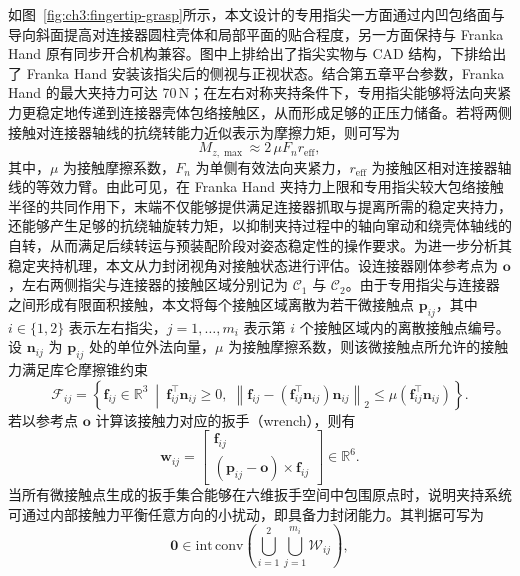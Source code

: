如图~\ref{fig:ch3:fingertip-grasp}所示，本文设计的专用指尖一方面通过内凹包络面与导向斜面提高对连接器圆柱壳体和局部平面的贴合程度，另一方面保持与 Franka Hand 原有同步开合机构兼容。图中上排给出了指尖实物与 CAD 结构，下排给出了 Franka Hand 安装该指尖后的侧视与正视状态。结合第五章平台参数，Franka Hand 的最大夹持力可达 70\,N；在左右对称夹持条件下，专用指尖能够将法向夹紧力更稳定地传递到连接器壳体包络接触区，从而形成足够的正压力储备。若将两侧接触对连接器轴线的抗绕转能力近似表示为摩擦力矩，则可写为
\begin{equation}
  M_{z,\max}\approx 2\,\mu F_n r_{\mathrm{eff}},
\end{equation}
其中，$\mu$ 为接触摩擦系数，$F_n$ 为单侧有效法向夹紧力，$r_{\mathrm{eff}}$ 为接触区相对连接器轴线的等效力臂。由此可见，在 Franka Hand 夹持力上限和专用指尖较大包络接触半径的共同作用下，末端不仅能够提供满足连接器抓取与提离所需的稳定夹持力，还能够产生足够的抗绕轴旋转力矩，以抑制夹持过程中的轴向窜动和绕壳体轴线的自转，从而满足后续转运与预装配阶段对姿态稳定性的操作要求。为进一步分析其稳定夹持机理，本文从力封闭视角对接触状态进行评估。设连接器刚体参考点为 $\mathbf{o}$，左右两侧指尖与连接器的接触区域分别记为 $\mathcal{C}_1$ 与 $\mathcal{C}_2$。由于专用指尖与连接器之间形成有限面积接触，本文将每个接触区域离散为若干微接触点 $\mathbf{p}_{ij}$，其中 $i\in\{1,2\}$ 表示左右指尖，$j=1,\dots,m_i$ 表示第 $i$ 个接触区域内的离散接触点编号。设 $\mathbf{n}_{ij}$ 为 $\mathbf{p}_{ij}$ 处的单位外法向量，$\mu$ 为接触摩擦系数，则该微接触点所允许的接触力满足库仑摩擦锥约束
\begin{equation}
  \mathcal{F}_{ij}=
  \left\{
  \mathbf{f}_{ij}\in\mathbb{R}^3\ \middle|\
  \mathbf{f}_{ij}^{\top}\mathbf{n}_{ij}\geq 0,\;
  \left\|\mathbf{f}_{ij}-\left(\mathbf{f}_{ij}^{\top}\mathbf{n}_{ij}\right)\mathbf{n}_{ij}\right\|_2
  \leq
  \mu\left(\mathbf{f}_{ij}^{\top}\mathbf{n}_{ij}\right)
  \right\}.
  \label{eq:ch3:friction-cone}
\end{equation}
若以参考点 $\mathbf{o}$ 计算该接触力对应的扳手（wrench），则有
\begin{equation}
  \mathbf{w}_{ij}=
  \begin{bmatrix}
    \mathbf{f}_{ij}\\
    (\mathbf{p}_{ij}-\mathbf{o})\times \mathbf{f}_{ij}
  \end{bmatrix}\in\mathbb{R}^{6}.
  \label{eq:ch3:wrench}
\end{equation}
当所有微接触点生成的扳手集合能够在六维扳手空间中包围原点时，说明夹持系统可通过内部接触力平衡任意方向的小扰动，即具备力封闭能力。其判据可写为
\begin{equation}
  \mathbf{0}\in
  \mathrm{int}\,
  \mathrm{conv}
  \left(
  \bigcup_{i=1}^{2}\bigcup_{j=1}^{m_i}\mathcal{W}_{ij}
  \right),
  \label{eq:ch3:force-closure}
\end{equation}

